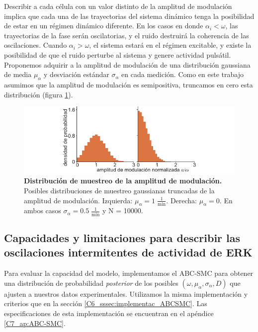 \documentclass[./main.tex]{subfiles}
\begin{document}
Describir a cada célula con un valor distinto de la amplitud de modulación implica que cada una de las trayectorias del sistema dinámico tenga la posibilidad de estar en un régimen dinámico diferente. En los casos en donde $\alpha_i < \omega$, las trayectorias de la fase serán oscilatorias, y el ruido destruirá la coherencia de las oscilaciones. Cuando $\alpha_i > \omega$, el sistema estará en el régimen excitable, y existe la posibilidad de que el ruido perturbe al sistema y genere actividad pulsátil. Proponemos adquirir a la amplitud de modulación de una distribución gaussiana de media $\mu_{\alpha}$ y desviación estándar $\sigma_{\alpha}$ en cada medición. Como en este trabajo asumimos que la amplitud de modulación es semipositiva, truncamos en cero esta distribución (figura \ref{C7_fig:dist_def}).


\begin{figure}
    \centering
    \includegraphics[width=1\columnwidth]{figures/chapter7/C7_dist_def.pdf} 
    \caption{\textbf{Distribución de muestreo de la amplitud de modulación.} Posibles distribuciones de muestreo gaussianas truncadas de la amplitud de modulación. Izquierda: $\mu_{\alpha} = 1 \; \frac{1}{\text{min}}$. Derecha: $\mu_{\alpha} = 0$. En ambos casos $\sigma_{\alpha} = 0.5 \; \frac{1}{\text{min}}$ y N = 10000. }
    \label{C7_fig:dist_def}
\end{figure} 


\subsection{Capacidades y limitaciones para describir las oscilaciones intermitentes de actividad de ERK}

Para evaluar la capacidad del modelo, implementamos el ABC-SMC para obtener una distribución de probabilidad \textit{posterior} de los posibles $(\omega,\mu_{\alpha},\sigma_{\alpha},D)$ que ajusten a nuestros datos experimentales. Utilizamos la misma implementación y criterios que en la sección \ref{C6_sssec:implementac_ABCSMC}. Las especificaciones de esta implementación se encuentran en el apéndice \ref{C7_ap:ABC-SMC}.
\end{document}
